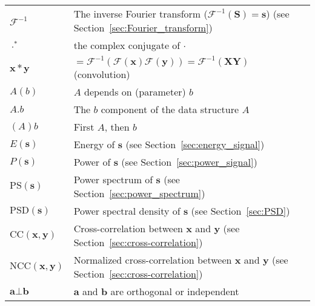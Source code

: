 \documentclass{report}%
\begin{document}
\begin{tabular}{ll}
  $\mathcal{F}^{-1}$ & The inverse Fourier transform ($\mathcal{F}^{-1}(\mathbf{S})=\mathbf{s}$)  (see Section~\ref{sec:Fourier_transform})\\
  $\cdot^*$ & the complex conjugate of $\cdot$ \\
  $\mathbf{x}*\mathbf{y}$ & $=\mathcal{F}^{-1}(\mathcal{F}(\mathbf{x})\mathcal{F}(\mathbf{y}))=\mathcal{F}^{-1}(\mathbf{X}\mathbf{Y})$ (convolution) \\
  $A(b)$ & $A$ depends on (parameter) $b$ \\
  $A.b$ & The $b$ component of the data structure $A$ \\
  $(A)b$ & First $A$, then $b$ \\
  $E(\mathbf{s})$ & Energy of $\mathbf{s}$ (see Section~\ref{sec:energy_signal}) \\
  $P(\mathbf{s})$ & Power of $\mathbf{s}$ (see Section~\ref{sec:power_signal}) \\
  $\text{PS}(\mathbf{s})$ & Power spectrum of $\mathbf{s}$ (see Section~\ref{sec:power_spectrum}) \\
  $\text{PSD}(\mathbf{s})$ & Power spectral density of $\mathbf{s}$ (see Section~\ref{sec:PSD}) \\
  $\text{CC}(\mathbf{x},\mathbf{y})$ & Cross-correlation between $\mathbf{x}$ and $\mathbf{y}$ (see Section~\ref{sec:cross-correlation}) \\
  $\text{NCC}(\mathbf{x},\mathbf{y})$ & Normalized cross-correlation between $\mathbf{x}$ and $\mathbf{y}$ (see Section~\ref{sec:cross-correlation}) \\
  $\mathbf{a}\bot \mathbf{b}$ & $\mathbf{a}$ and $\mathbf{b}$ are orthogonal or independent                                
\end{tabular}













\end{document}
